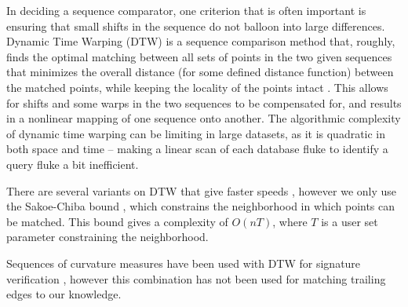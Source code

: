 In deciding a sequence comparator, one criterion that is often important is ensuring that small shifts in the sequence do not balloon into large differences.
Dynamic Time Warping (DTW) is a sequence comparison method that, roughly, finds the optimal matching between all sets of points in the two given sequences that minimizes the overall distance (for some defined distance function) between the matched points, while keeping the locality of the points intact \cite{sakoe1978dynamic}.
This allows for shifts and some warps in the two sequences to be compensated for, and results in a nonlinear mapping of one sequence onto another.
The algorithmic complexity of dynamic time warping can be limiting in large datasets, as it is quadratic in both space and time -- making a linear scan of each database fluke to identify a query fluke a bit inefficient.

There are several variants on DTW that give faster speeds \cite{salvador2007fastdtw, lemire2009faster}, however we only use the Sakoe-Chiba bound \cite{sakoe1978dynamic}, which constrains the neighborhood in which points can be matched.
This bound gives a complexity of $O(nT)$, where $T$ is a user set parameter constraining the neighborhood.

Sequences of curvature measures have been used with DTW for signature verification \cite{munich1999continuous}, however this combination has not been used for matching trailing edges to our knowledge.

